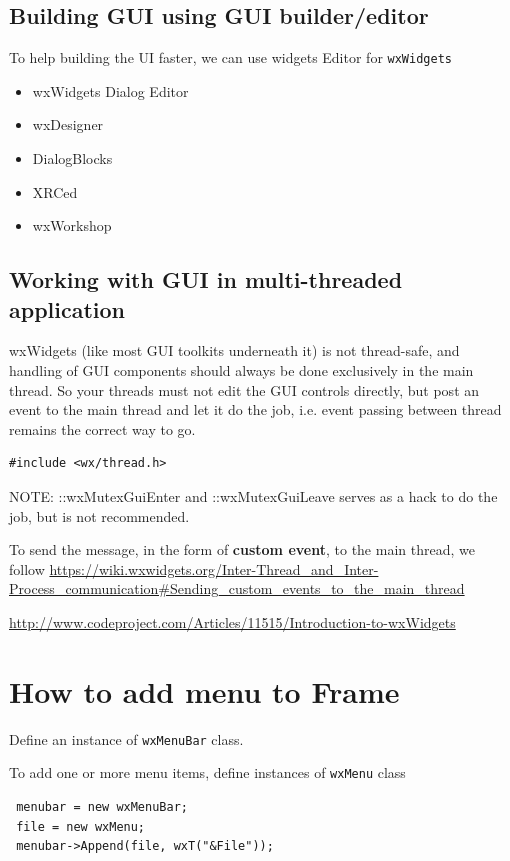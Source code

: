 \subsection{Building GUI using GUI builder/editor}

To help building the UI faster, we can use widgets Editor for \verb!wxWidgets!
\begin{itemize}
  \item wxWidgets Dialog Editor
  \item wxDesigner
  \item DialogBlocks
  \item XRCed
  \item wxWorkshop
\end{itemize}

\subsection{Working with GUI in multi-threaded application}

wxWidgets (like most GUI toolkits underneath it) is not thread-safe, and
handling of GUI components should always be done exclusively in the main thread.
So your threads must not edit the GUI controls directly, but post an event to
the main thread and let it do the job, i.e.
event passing between thread remains the correct way to go.

\begin{verbatim}
#include <wx/thread.h>
\end{verbatim}

NOTE:  ::wxMutexGuiEnter and ::wxMutexGuiLeave serves as a hack to do the job, but is not recommended.

To send the message, in the form of {\bf custom event}, to the main thread, we follow
\url{https://wiki.wxwidgets.org/Inter-Thread_and_Inter-Process_communication#Sending_custom_events_to_the_main_thread}

\url{http://www.codeproject.com/Articles/11515/Introduction-to-wxWidgets}


\section{How to add menu to Frame}

Define an instance of \verb!wxMenuBar! class. 

To add one or more menu items, define instances of \verb!wxMenu! class
\begin{verbatim}
 menubar = new wxMenuBar;
 file = new wxMenu;
 menubar->Append(file, wxT("&File"));
\end{verbatim}

